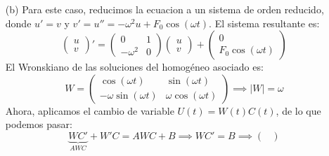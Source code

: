 {\begin{enumerate}
\[        \]
        \[
            - m (\omega^2 - \gamma^2) \cos(\gamma t) = F_0 \cos(\gamma t) \implies
            m = \frac{F_0}{\omega^2 - \gamma^2}
        \]
        Y si ahora variamos los parámetros, proponiendo $u_p(t) = x_1 \cos t + x_2 \sin t$, obtenemos:
        \[
            u_p = x_1 \cos t + x_2 \sin t + \frac{F_0}{\omega^2 - \gamma^2} \cos(\gamma t) \implies
            u(0) = x_1 + \frac{F_0}{\omega^2 - \gamma^2} = 0 \implies
            x_1 = -\frac{F_0}{\omega^2 - \gamma^2}
        \]
        \[
            u'(t) = -x_1 \sin t + x_2 \cos t - \frac{F_0 \gamma}{\omega^2 - \gamma^2} \sin(\gamma t) \implies
            u'(0) = x_2 = 0
        \]
        Y por lo tanto, la solución particular es:
        \[
            u_\gamma(t) = \frac{F_0}{\omega^2 - \gamma^2} (\cos(\gamma t) - \cos(\omega t))
        \]
        \item[(b)] Para este caso, reducimos la ecuacion a un sistema de orden reducido, donde $u'=v$ y $v' = u'' = -\omega^2 u + F_0 \cos(\omega t)$. El sistema resultante es:
        \[
            \begin{pmatrix}
                u \\ v
            \end{pmatrix}'
            =
            \begin{pmatrix}
                0 & 1 \\
                -\omega^2 & 0
            \end{pmatrix}
            \begin{pmatrix}
                u \\ v
            \end{pmatrix}
            +
            \begin{pmatrix}
                0 \\ F_0 \cos(\omega t)
            \end{pmatrix}
        \]
        El Wronskiano de las soluciones del homogéneo asociado es:
        \[
            W =
            \begin{pmatrix}
                \cos(\omega t) & \sin(\omega t) \\
                -\omega \sin(\omega t) & \omega \cos(\omega t)
            \end{pmatrix}
            \implies
            |W| = \omega
        \]
        Ahora, aplicamos el cambio de variable $U(t) = W(t) C(t)$, de lo que podemos pasar:
        \[
            \underbrace{W C'}_{AWC} + W' C = A W C + B \implies
            W C' = B \implies
            \begin{pmatrix}

\end{pmatrix}\]
\end{enumerate}}
